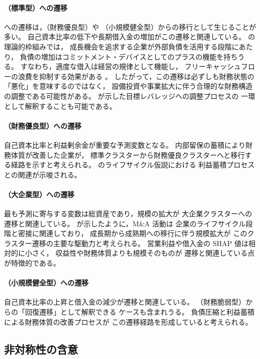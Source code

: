 \paragraph{（標準型）への遷移}
 への遷移は，（財務優良型）や
（小規模健全型）からの移行として生じることが多い。
自己資本比率の低下や長期借入金の増加がこの遷移と関連している。
 の理論的枠組みでは，
成長機会を追求する企業が外部負債を活用する段階にあたり，
負債の増加はコミットメント・デバイスとしてのプラスの機能を持ちうる。
すなわち，適度な借入は経営の規律として機能し，
フリーキャッシュフローの浪費を抑制する効果がある
\citep{Myers1984}。
したがって，この遷移は必ずしも財務状態の「悪化」を意味するのではなく，
設備投資や事業拡大に伴う合理的な財務構造の調整である可能性がある。
 が示した目標レバレッジへの調整プロセスの
一環として解釈することも可能である。

\paragraph{（財務優良型）への遷移}
自己資本比率と利益剰余金が重要な予測変数となる。
内部留保の蓄積により財務体質が改善した企業が，
標準クラスターから財務優良クラスターへと移行する経路を示すと考えられる。
 のライフサイクル仮説における
利益蓄積プロセスとの関連が示唆される。

\paragraph{（大企業型）への遷移}
最も予測に寄与する変数は総資産であり，規模の拡大が
大企業クラスターへの遷移と関連している。
 が示したように，M\&A 活動は
企業のライフサイクル段階と密接に関連しており，
成長期から成熟期への移行に伴う規模拡大が
このクラスター遷移の主要な駆動力と考えられる。
営業利益や借入金の SHAP 値は相対的に小さく，
収益性や財務体質よりも規模そのものが
遷移と関連している点が特徴的である。

\paragraph{（小規模健全型）への遷移}
自己資本比率の上昇と借入金の減少が遷移と関連している。
（財務脆弱型）からの「回復遷移」として解釈できる
ケースも含まれうる。
負債圧縮と利益蓄積による財務体質の改善プロセスが
この遷移経路を形成していると考えられる。

\subsection{非対称性の含意}

